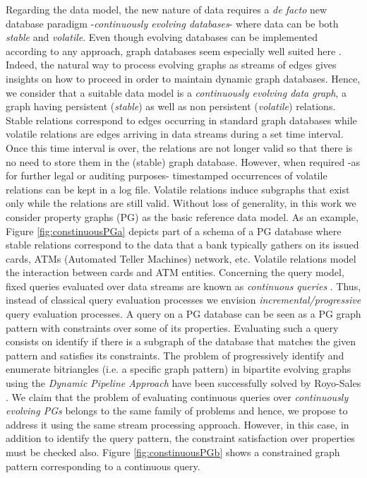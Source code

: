 \noindent
Regarding the data model, the new nature of data requires a \emph{de facto} new database paradigm -\emph{continuously evolving  databases}- where data can be both \emph{stable} and \emph{volatile}. Even though evolving databases can be implemented according to any approach, graph databases seem especially well suited  here \textcolor{blue}{\cite{GDB-angles2008survey, GDB-kumar2015graph}}. Indeed, the natural way to process evolving graphs as streams of edges gives insights on how to proceed in order to maintain dynamic graph databases.  Hence, we consider that a suitable data model is a \emph{continuously evolving data graph}, a graph having persistent (\emph{stable}) as well as non persistent (\emph{volatile}) relations. Stable relations correspond to edges occurring in standard graph databases while volatile relations are edges arriving in data streams during a set time interval. Once this time interval is over, the relations are not longer valid so that there is no need to store them in the (stable) graph database. However,  when required -as for further legal or auditing purposes- timestamped occurrences of volatile relations can  be kept in a log file. Volatile relations induce subgraphs that exist only while the relations are still valid. Without loss of generality, in this work we consider property graphs (PG) \cite{PG-angles2017foundations, angles2018propertyGraphDatabaseModel} as the basic reference data model. As an example, Figure \ref{fig:constinuousPGa} depicts part of a schema of a PG database where stable relations correspond to the data that a bank typically gathers on its issued cards, ATMs (Automated Teller Machines) network, etc. Volatile relations model the interaction between cards and ATM entities. Concerning the query model, fixed queries evaluated over data streams are known as \emph{continuous queries} \cite{CQ-babu2001continuous,CQ-zaniolo2012logical}. Thus, instead of classical query evaluation processes we envision \emph{incremental/progressive} query evaluation processes. 
%
A query on a PG database can be seen as a PG graph pattern with constraints over some of its properties. Evaluating such a query consists on identify if there is a subgraph of the database that matches the given pattern and satisfies its constraints. 
The problem of progressively identify and enumerate bitriangles (i.e. a specific graph pattern) in bipartite evolving graphs using the \emph{Dynamic Pipeline Approach} \cite{DP-pasarella2024computational} have been successfully solved by Royo-Sales \cite{DP-bitriangles2021}.  We claim that the problem of evaluating continuous queries over \emph{continuously evolving PGs} belongs to the same family of problems and hence, we propose to address it using the same stream processing approach. However, in this case, in addition to identify the query pattern, the constraint satisfaction over properties must be checked also. Figure \ref{fig:constinuousPGb} shows a constrained graph pattern corresponding to a continuous query.
